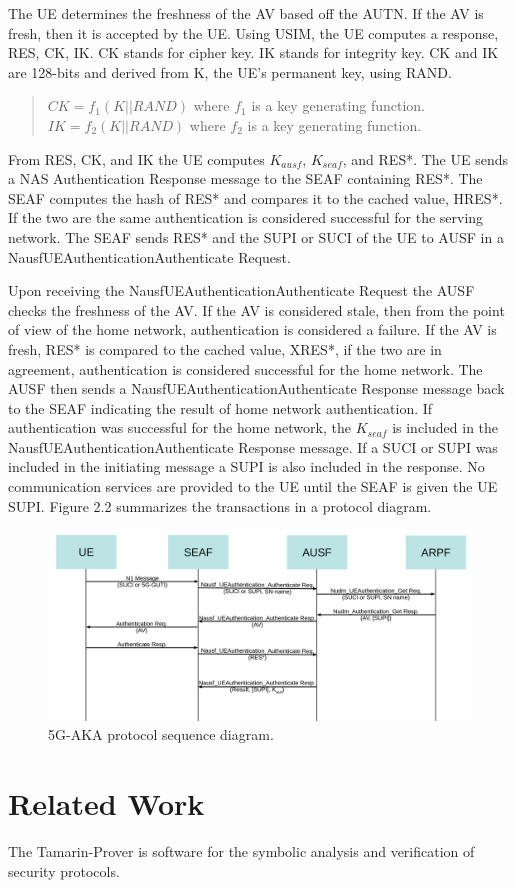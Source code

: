 \documentclass[11pt, pdftex]{article}
\begin{document}
The UE determines the freshness of the AV based off the AUTN.  If the AV is fresh, then it is accepted by the UE.  Using USIM, the UE computes a response, RES, CK, IK.  CK stands for cipher key.  IK stands for integrity key.  CK and IK are 128-bits and derived from K, the UE's permanent key, using RAND.  
\begin{quote}
	$CK = f_1(K||RAND) $ where $ f_1 $ is a key generating function.
	\newline
	$IK = f_2(K||RAND) $ where $ f_2 $ is a key generating function.
\end{quote} 
From RES, CK, and IK the UE computes $K_{ausf}$, $K_{seaf}$, and RES*.  The UE sends a NAS Authentication Response message to the SEAF containing RES*.  The SEAF computes the hash of RES* and compares it to the cached value, HRES*.  If the two are the same authentication is considered successful for the serving network.  The SEAF sends RES* and the SUPI or SUCI of the UE to AUSF in a Nausf\textunderscore UEAuthentication\textunderscore Authenticate Request.  

Upon receiving the Nausf\textunderscore UEAuthentication\textunderscore Authenticate Request the AUSF checks the freshness of the AV.  If the AV is considered stale, then from the point of view of the home network, authentication is considered a failure.  If the AV is fresh, RES* is compared to the cached value, XRES*, if the two are in agreement, authentication is considered successful for the home network.  The AUSF then sends a Nausf\textunderscore UEAuthentication\textunderscore Authenticate Response message back to the SEAF indicating the result of home network authentication.  If authentication was successful for the home network, the $K_{seaf}$ is included in the Nausf\textunderscore UEAuthentication\textunderscore Authenticate Response message.  If a SUCI or SUPI was included in the initiating message a SUPI is also included in the response.  No communication services are provided to the UE until the SEAF is given the UE SUPI.  Figure 2.2 summarizes the transactions in a protocol diagram.

\begin{figure}[h]
	\begin{center}
		\includegraphics[scale=0.21]{Figure2_2.png}
	\end{center}
	\caption{5G-AKA protocol sequence diagram.}
\end{figure}


\section{Related Work}
The Tamarin-Prover is software for the symbolic analysis and verification of security protocols.



     
\nocite{*}


\end{document}
